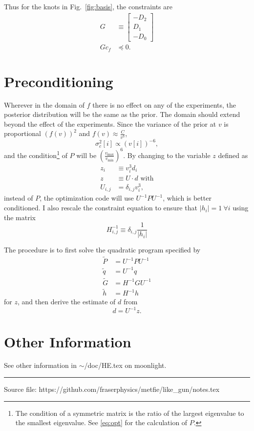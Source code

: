 \documentclass[11pt]{article}
\newcommand{\eos}{f}
\newcommand\cf{c_f}
\begin{document}
Thus for the knots in Fig.~\ref{fig:basis}, the constraints are
\begin{align}
  G & \equiv
      \begin{bmatrix}
        - D_2 \\ D_1 \\ -D_0
      \end{bmatrix}\\
  \label{eq:constraint}
  G\cf & \preceq 0.
\end{align}

\section{Preconditioning}
\label{sec:preconditioning}

Wherever in the domain of $\eos$ there is no effect on any of the
experiments, the posterior distribution will be the same as the prior.
The domain should extend beyond the effect of the experiments.
Since the variance of the prior at $v$ is proportional $(f(v))^2$ and
$f(v) \approx \frac{C}{v^3}$,
\begin{equation}
  \label{eq:var_f}
  \sigma^2_{c}[i] \propto (v[i])^{-6},
\end{equation}
and the condition\footnote{The condition of a symmetric matrix is the
  ratio of the largest eigenvalue to the smallest eigenvalue.  See
  \eqref{eq:opt} for the calculation of $P$.} of $P$ will be
$\left( \frac{v_{\text{max}}}{v_{\text{min}}} \right)^6$.  By
changing to the variable $z$ defined as
\begin{align*}
  z_i &\equiv v_i^3 d_i \\
  z &\equiv U \cdot d \text{ with} \\
  U_{i,j} &= \delta_{i,j} v_i^3,
\end{align*}
\newcommand{\UI}{U^{-1}} instead of $P$, the optimization code will use
$\UI P \UI$, which is better conditioned.  I also rescale the
constraint equation to ensure that $\left| h_i \right|=1~\forall i$
using the matrix
\begin{equation*}
  H^{-1}_{i,j} \equiv \delta_{i,j} \frac{1}{\left|h_i\right|}
\end{equation*}


The procedure is to first solve the quadratic program specified by
\begin{align*}
  \tilde P &= \UI P \UI \\
  \tilde q &= \UI q \\
  \tilde G &= H^{-1}G \UI \\
  \tilde h &= H^{-1}h
\end{align*}
for $z$, and then derive the estimate of $d$ from
\begin{equation*}
  d = \UI z.
\end{equation*}

\section{Other Information}
\label{sec:appendix}

See other information in $\sim$/doc/HE.tex on moonlight.

 
%
\vfill \hrule

Source file: https://github.com/fraserphysics/metfie/like\_gun/notes.tex
\end{document}
